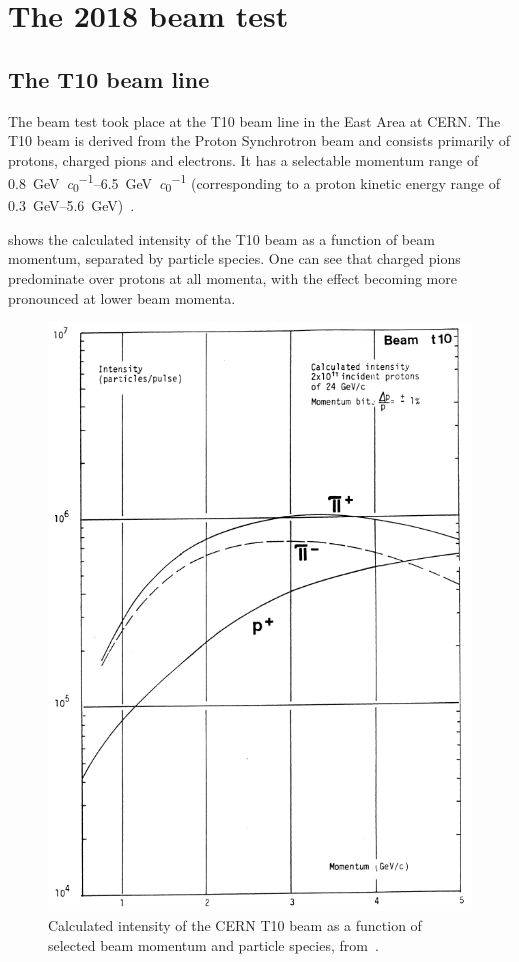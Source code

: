 \section{The 2018 beam test}
\label{sec:hptpc_beam_flux:overview}

\subsection{The T10 beam line}
\label{sec:hptpc_beam_flux:overview:t10}

The beam test took place at the T10 beam line in the East Area at CERN.
The T10 beam is derived from the Proton Synchrotron beam and consists primarily of protons, charged pions and electrons.
It has a selectable momentum range of \SIrange{0.8}{6.5}{\giga\electronvolt\per\clight} (corresponding to a proton kinetic energy range of \SIrange{0.3}{5.6}{\giga\electronvolt})~\cite{t10Report}.

 shows the calculated intensity of the T10 beam as a function of beam momentum, separated by particle species.
One can see that charged pions predominate over protons at all momenta, with the effect becoming more pronounced at lower beam momenta.

\begin{figure}[h]
  \centering
  \includegraphics[width=.6\linewidth]{files/figures/hptpc_beam_flux/t10Comp}
  \caption[Calculated intensity of the CERN T10 beam as a function of selected beam momentum and particle species.]{Calculated intensity of the CERN T10 beam as a function of selected beam momentum and particle species, from~\cite{t10Report}.}
  \label{fig:t10Calc}
\end{figure}


